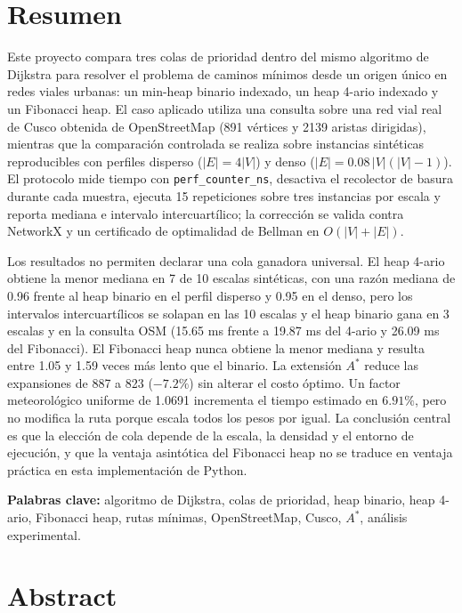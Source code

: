 \section*{Resumen}

Este proyecto compara tres colas de prioridad dentro del mismo algoritmo de Dijkstra para resolver el problema de caminos mínimos desde un origen único en redes viales urbanas: un min-heap binario indexado, un heap 4-ario indexado y un Fibonacci heap. El caso aplicado utiliza una consulta sobre una red vial real de Cusco obtenida de OpenStreetMap (891 vértices y 2139 aristas dirigidas), mientras que la comparación controlada se realiza sobre instancias sintéticas reproducibles con perfiles disperso ($|E|=4|V|$) y denso ($|E|=0.08\,|V|(|V|-1)$). El protocolo mide tiempo con \texttt{perf\_counter\_ns}, desactiva el recolector de basura durante cada muestra, ejecuta 15 repeticiones sobre tres instancias por escala y reporta mediana e intervalo intercuartílico; la corrección se valida contra NetworkX y un certificado de optimalidad de Bellman en $O(|V|+|E|)$.

Los resultados no permiten declarar una cola ganadora universal. El heap 4-ario obtiene la menor mediana en 7 de 10 escalas sintéticas, con una razón mediana de 0.96 frente al heap binario en el perfil disperso y 0.95 en el denso, pero los intervalos intercuartílicos se solapan en las 10 escalas y el heap binario gana en 3 escalas y en la consulta OSM (15.65 ms frente a 19.87 ms del 4-ario y 26.09 ms del Fibonacci). El Fibonacci heap nunca obtiene la menor mediana y resulta entre 1.05 y 1.59 veces más lento que el binario. La extensión $A^*$ reduce las expansiones de 887 a 823 ($-7.2\%$) sin alterar el costo óptimo. Un factor meteorológico uniforme de 1.0691 incrementa el tiempo estimado en $6.91\%$, pero no modifica la ruta porque escala todos los pesos por igual. La conclusión central es que la elección de cola depende de la escala, la densidad y el entorno de ejecución, y que la ventaja asintótica del Fibonacci heap no se traduce en ventaja práctica en esta implementación de Python.

\vspace{0.4cm}
\noindent\textbf{Palabras clave:} algoritmo de Dijkstra, colas de prioridad, heap binario, heap 4-ario, Fibonacci heap, rutas mínimas, OpenStreetMap, Cusco, $A^*$, análisis experimental.

\vspace{0.8cm}
\section*{Abstract}

